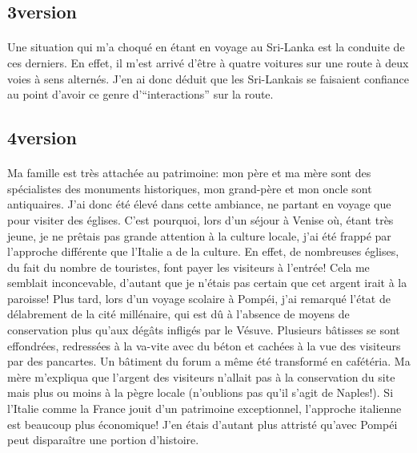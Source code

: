 \subsection{3\ieme version}

\paragraph{} Une situation qui m'a choqué en étant en voyage au Sri-Lanka est
la conduite de ces derniers. En effet, il m'est arrivé d'être à quatre voitures
sur une route à deux voies à sens alternés. J'en ai donc déduit que les
Sri-Lankais se faisaient confiance au point d'avoir ce genre d'``interactions''
sur la route.

\subsection{4\ieme version}

\paragraph{} Ma famille est très attachée au patrimoine: mon père et ma mère
sont des spécialistes des monuments historiques, mon grand-père et mon oncle
sont antiquaires. J'ai donc été élevé dans cette ambiance, ne partant en voyage
que pour visiter des églises. C'est pourquoi, lors d'un séjour à Venise où,
étant très jeune, je ne prêtais pas grande attention à la culture locale, j'ai
été frappé par l'approche différente que l'Italie a de la culture. En effet, de
nombreuses églises, du fait du nombre de touristes, font payer les visiteurs à
l'entrée! Cela me semblait inconcevable, d'autant que je n'étais pas certain
que cet argent irait à la paroisse! Plus tard, lors d'un voyage scolaire à
Pompéi, j'ai remarqué l'état de délabrement de la cité millénaire, qui est dû à
l'absence de moyens de conservation plus qu'aux dégâts infligés par le Vésuve.
Plusieurs bâtisses se sont effondrées, redressées à la va-vite avec du béton et
cachées à la vue des visiteurs par des pancartes. Un bâtiment du forum a même
été transformé en cafétéria. Ma mère m'expliqua que l'argent des visiteurs
n'allait pas à la conservation du site mais plus ou moins à la pègre locale
(n'oublions pas qu'il s'agit de Naples!). Si l'Italie comme la France jouit
d'un patrimoine exceptionnel, l'approche italienne est beaucoup plus
économique! J'en étais d'autant plus attristé qu'avec Pompéi peut disparaître
une portion d'histoire.

